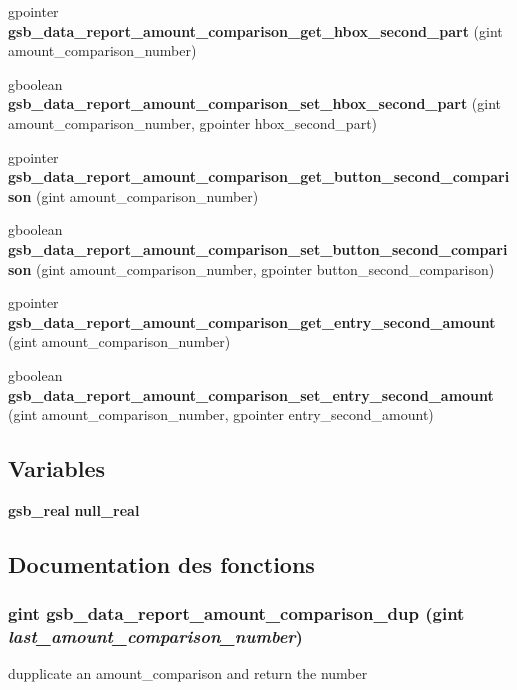 \begin{DoxyCompactItemize}
\item 
gpointer {\bf gsb\_\-data\_\-report\_\-amount\_\-comparison\_\-get\_\-hbox\_\-second\_\-part} (gint amount\_\-comparison\_\-number)
\item 
gboolean {\bf gsb\_\-data\_\-report\_\-amount\_\-comparison\_\-set\_\-hbox\_\-second\_\-part} (gint amount\_\-comparison\_\-number, gpointer hbox\_\-second\_\-part)
\item 
gpointer {\bf gsb\_\-data\_\-report\_\-amount\_\-comparison\_\-get\_\-button\_\-second\_\-comparison} (gint amount\_\-comparison\_\-number)
\item 
gboolean {\bf gsb\_\-data\_\-report\_\-amount\_\-comparison\_\-set\_\-button\_\-second\_\-comparison} (gint amount\_\-comparison\_\-number, gpointer button\_\-second\_\-comparison)
\item 
gpointer {\bf gsb\_\-data\_\-report\_\-amount\_\-comparison\_\-get\_\-entry\_\-second\_\-amount} (gint amount\_\-comparison\_\-number)
\item 
gboolean {\bf gsb\_\-data\_\-report\_\-amount\_\-comparison\_\-set\_\-entry\_\-second\_\-amount} (gint amount\_\-comparison\_\-number, gpointer entry\_\-second\_\-amount)
\end{DoxyCompactItemize}
\subsection*{Variables}
\begin{DoxyCompactItemize}
\item 
{\bf gsb\_\-real} {\bf null\_\-real}
\end{DoxyCompactItemize}


\subsection{Documentation des fonctions}
\subsubsection[{gsb\_\-data\_\-report\_\-amount\_\-comparison\_\-dup}]{\setlength{\rightskip}{0pt plus 5cm}gint gsb\_\-data\_\-report\_\-amount\_\-comparison\_\-dup (gint {\em last\_\-amount\_\-comparison\_\-number})}\label{gsb__data__report__amout__comparison_8c_ac710856ddf27a344cd4f12923b9c6194}
dupplicate an amount\_\-comparison and return the number


